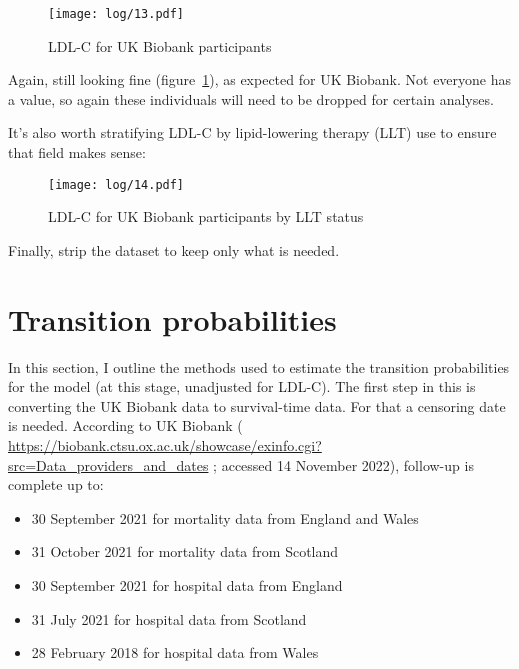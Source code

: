 \documentclass[11pt]{article}
\begin{document}
\color{Blue4}
\begin{figure}
    \centering
    \texttt{[image: log/13.pdf]}
    \caption{LDL-C for UK Biobank participants}
    \label{LDLhist}
\end{figure}
\begin{stlog}\end{stlog}
\color{black}

Again, still looking fine (figure~\ref{LDLhist}), as expected for UK Biobank. 
Not everyone has a value, so again these individuals will need to be 
dropped for certain analyses. 

It's also worth stratifying LDL-C by lipid-lowering therapy (LLT) use
to ensure that field makes sense:

\color{Blue4}
\begin{figure}
    \centering
    \texttt{[image: log/14.pdf]}
    \caption{LDL-C for UK Biobank participants by LLT status}
    \label{LDLhist2}
\end{figure}
\begin{stlog}\end{stlog}
\color{black}

Finally, strip the dataset to keep only what is needed.

\color{Blue4}
\begin{stlog}\end{stlog}
\color{black}

\clearpage
\pagebreak
\section{Transition probabilities}
\label{TPs}

In this section, I outline the methods used to estimate the transition probabilities 
for the model (at this stage, unadjusted for LDL-C). 
The first step in this is converting the UK Biobank data to survival-time data. 
For that a censoring date is needed. According to UK Biobank 
(\color{blue}
\url{https://biobank.ctsu.ox.ac.uk/showcase/exinfo.cgi?src=Data_providers_and_dates}
\color{black}
; accessed 14 November 2022), 
follow-up is complete up to:
\begin{itemize}
\item 30 September 2021 for mortality data from England and Wales
\item 31 October 2021 for mortality data from Scotland
\item 30 September 2021 for hospital data from England
\item 31 July 2021 for hospital data from Scotland
\item 28 February 2018 for hospital data from Wales
\end{itemize}
\end{document}

